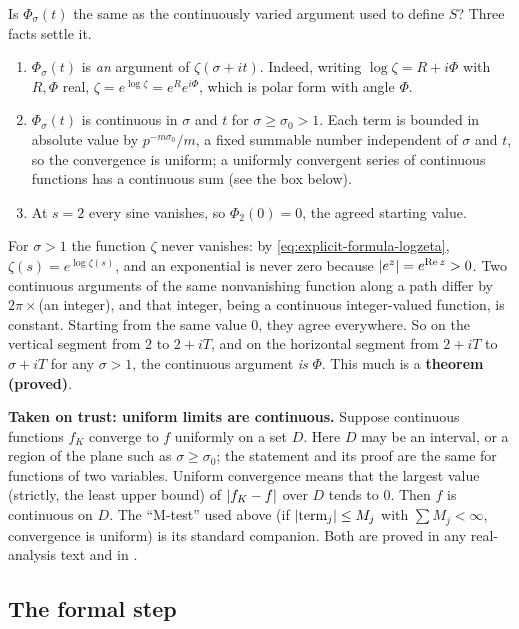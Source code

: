 Is $\Phi_\sigma(t)$ the same as the continuously varied argument used to define $S$? Three facts settle it.
\begin{enumerate}
\item $\Phi_\sigma(t)$ is \emph{an} argument of $\zeta(\sigma+it)$. Indeed, writing $\log\zeta=R+i\Phi$ with $R,\Phi$ real, $\zeta=e^{\log\zeta}=e^{R}e^{i\Phi}$, which is polar form with angle $\Phi$.
\item $\Phi_\sigma(t)$ is continuous in $\sigma$ and $t$ for $\sigma\ge\sigma_0>1$. Each term is bounded in absolute value by $p^{-m\sigma_0}/m$, a fixed summable number independent of $\sigma$ and $t$, so the convergence is uniform; a uniformly convergent series of continuous functions has a continuous sum (see the box below).
\item At $s=2$ every sine vanishes, so $\Phi_2(0)=0$, the agreed starting value.
\end{enumerate}
For $\sigma>1$ the function $\zeta$ never vanishes: by \cref{eq:explicit-formula-logzeta}, $\zeta(s)=e^{\log\zeta(s)}$, and an exponential is never zero because $\left\lvert e^{z}\right\rvert=e^{\operatorname{Re} z}>0$. Two continuous arguments of the same nonvanishing function along a path differ by $2\pi\times$(an integer), and that integer, being a continuous integer-valued function, is constant. Starting from the same value $0$, they agree everywhere. So on the vertical segment from $2$ to $2+iT$, and on the horizontal segment from $2+iT$ to $\sigma+iT$ for any $\sigma>1$, the continuous argument \emph{is} $\Phi$. This much is a \textbf{theorem (proved)}.

\begin{beyond}
\textbf{Taken on trust: uniform limits are continuous.} Suppose continuous functions $f_K$ converge to $f$ uniformly on a set $D$. Here $D$ may be an interval, or a region of the plane such as $\sigma\ge\sigma_0$; the statement and its proof are the same for functions of two variables. Uniform convergence means that the largest value (strictly, the least upper bound) of $\left\lvert f_K-f\right\rvert$ over $D$ tends to $0$. Then $f$ is continuous on $D$. The ``M-test'' used above (if $\left\lvert \text{term}_j\right\rvert\le M_j$ with $\sum M_j<\infty$, convergence is uniform) is its standard companion. Both are proved in any real-analysis text and in \cite{rhb}.
\end{beyond}

\subsection{The formal step}

